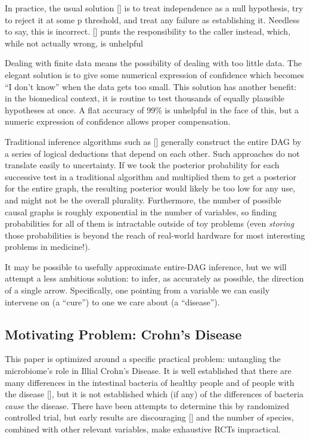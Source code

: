 \documentclass[letterpaper]{article}
\begin{document}
In practice, the usual solution [\cite{akelleh,pcalg}] is to treat independence as a null
hypothesis, try to reject it at some p threshold, and treat any
failure as establishing it.  Needless to say, this is incorrect.
[\cite{bayesnet}] punts the responsibility to the caller instead,
which, while not actually wrong, is unhelpful

Dealing with finite data means the possibility of dealing with too
little data.  The elegant solution is to give some numerical
expression of confidence which becomes ``I don't know'' when the data
gets too small.  This solution has another benefit: in the biomedical
context, it is routine to test thousands of equally plausible
hypotheses at once.  A flat accuracy of 99\% is unhelpful in the face
of this, but a numeric expression of confidence allows proper
compensation.

Traditional inference algorithms such as [\cite{Pearl}] generally
construct the entire DAG by a series of logical deductions that depend
on each other.  Such approaches do not translate easily to
uncertainty.  If we took the posterior probability for each
successive test in a traditional algorithm and multiplied them to get
a posterior for the entire graph, the resulting posterior would likely
be too low for any use, and might not be the overall plurality.
Furthermore, the number of possible causal graphs is roughly
exponential in the number of variables, so finding probabilities for
all of them is intractable outside of toy problems (even
\textit{storing} those probabilities is beyond the reach of real-world
hardware for most interesting problems in medicine!).

It may be possible to usefully approximate entire-DAG inference, but
we will attempt a less ambitious solution: to infer, as accurately as
possible, the direction of a single arrow.  Specifically, one pointing
from a variable we can easily intervene on (a ``cure'') to one we care
about (a ``disease'').

\subsection{Motivating Problem: Crohn's Disease}

This paper is optimized around a specific practical problem:
untangling the microbiome's role in Illial Crohn's Disease.  It is
well established that there are many differences in the intestinal
bacteria of healthy people and of people with the disease
[\cite{hofer}], but it is not established which (if any) of the differences of
bacteria \textit{cause} the disease.  
There have been attempts to determine this by randomized controlled
trial, but early results are discouraging [\cite{rctma}] and the number
of species, combined with other relevant
variables, make exhaustive RCTs impractical.
\end{document}
